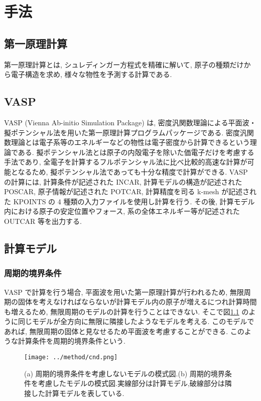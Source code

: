 \chapter{手法}


\section{第一原理計算}
第一原理計算とは, シュレディンガー方程式を精確に解いて, 原子の種類だけから電子構造を求め, 様々な物性を予測する計算である. 


\section{VASP}
VASP (Vienna Ab-initio Simulation Package) は, 密度汎関数理論による平面波・擬ポテンシャル法を用いた第一原理計算プログラムパッケージである. 密度汎関数理論とは電子系等のエネルギーなどの物性は電子密度から計算できるという理論である. 擬ポテンシャル法とは原子の内殻電子を除いた価電子だけを考慮する手法であり, 全電子を計算するフルポテンシャル法に比べ比較的高速な計算が可能となるため, 擬ポテンシャル法であっても十分な精度で計算ができる.
VASP の計算には, 計算条件が記述された INCAR, 計算モデルの構造が記述された POSCAR, 原子情報が記述された POTCAR, 計算精度を司る k-mesh が記述された KPOINTS の 4 種類の入力ファイルを使用し計算を行う. その後, 計算モデル内における原子の安定位置やフォース, 系の全体エネルギー等が記述された OUTCAR 等を出力する.


\section{計算モデル}
\subsection{周期的境界条件}
VASP で計算を行う場合, 平面波を用いた第一原理計算が行われるため, 無限周期の固体を考えなければならないが計算モデル内の原子が増えるにつれ計算時間も増えるため, 無限周期のモデルの計算を行うことはできない. そこで図\ref{fig2.1} のように同じモデルが全方向に無限に隣接したようなモデルを考える. このモデルであれば, 無限周期の固体と見なせるため平面波を考慮することができる. このような計算条件を周期的境界条件という.

\begin{figure}[htbp]
	\begin{center}
		\texttt{[image: ../method/cnd.png]}
		\caption{(a) 周期的境界条件を考慮しないモデルの模式図.(b) 周期的境界条件を考慮したモデルの模式図.実線部分は計算モデル,破線部分は隣接した計算モデルを表している.}
		\label{fig2.1}
	\end{center}
\end{figure}


